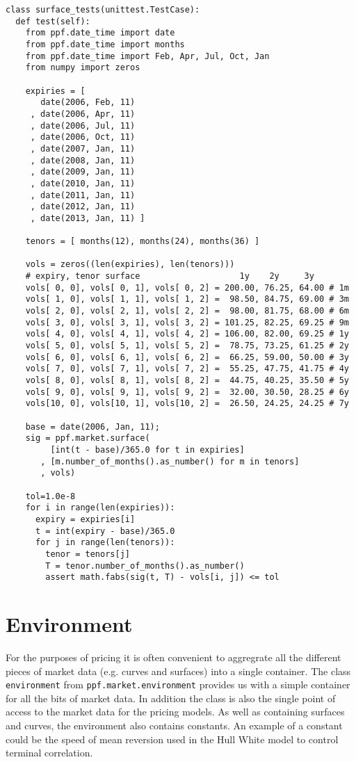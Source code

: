 \begin{verbatim}
class surface_tests(unittest.TestCase):
  def test(self):
    from ppf.date_time import date
    from ppf.date_time import months
    from ppf.date_time import Feb, Apr, Jul, Oct, Jan
    from numpy import zeros

    expiries = [
       date(2006, Feb, 11)
     , date(2006, Apr, 11)
     , date(2006, Jul, 11)
     , date(2006, Oct, 11)
     , date(2007, Jan, 11)
     , date(2008, Jan, 11)
     , date(2009, Jan, 11)
     , date(2010, Jan, 11)
     , date(2011, Jan, 11)
     , date(2012, Jan, 11)
     , date(2013, Jan, 11) ]

    tenors = [ months(12), months(24), months(36) ]

    vols = zeros((len(expiries), len(tenors)))
    # expiry, tenor surface                    1y    2y     3y                                
    vols[ 0, 0], vols[ 0, 1], vols[ 0, 2] = 200.00, 76.25, 64.00 # 1m
    vols[ 1, 0], vols[ 1, 1], vols[ 1, 2] =  98.50, 84.75, 69.00 # 3m
    vols[ 2, 0], vols[ 2, 1], vols[ 2, 2] =  98.00, 81.75, 68.00 # 6m
    vols[ 3, 0], vols[ 3, 1], vols[ 3, 2] = 101.25, 82.25, 69.25 # 9m
    vols[ 4, 0], vols[ 4, 1], vols[ 4, 2] = 106.00, 82.00, 69.25 # 1y
    vols[ 5, 0], vols[ 5, 1], vols[ 5, 2] =  78.75, 73.25, 61.25 # 2y
    vols[ 6, 0], vols[ 6, 1], vols[ 6, 2] =  66.25, 59.00, 50.00 # 3y
    vols[ 7, 0], vols[ 7, 1], vols[ 7, 2] =  55.25, 47.75, 41.75 # 4y
    vols[ 8, 0], vols[ 8, 1], vols[ 8, 2] =  44.75, 40.25, 35.50 # 5y
    vols[ 9, 0], vols[ 9, 1], vols[ 9, 2] =  32.00, 30.50, 28.25 # 6y
    vols[10, 0], vols[10, 1], vols[10, 2] =  26.50, 24.25, 24.25 # 7y

    base = date(2006, Jan, 11);
    sig = ppf.market.surface(
         [int(t - base)/365.0 for t in expiries]
       , [m.number_of_months().as_number() for m in tenors]
       , vols)

    tol=1.0e-8
    for i in range(len(expiries)):
      expiry = expiries[i]
      t = int(expiry - base)/365.0
      for j in range(len(tenors)):
        tenor = tenors[j]
        T = tenor.number_of_months().as_number()
        assert math.fabs(sig(t, T) - vols[i, j]) <= tol 
\end{verbatim}

\section{Environment} \label{sec:market}

For the purposes of pricing it is often convenient to aggregrate all
the different pieces of market data (e.g. curves and surfaces) into a
single container. The class \verb|environment| from
\verb|ppf.market.environment| provides us with a simple container for
all the bits of market data. In addition the class is also the single
point of access to the market data for the pricing models. As well as
containing surfaces and curves, the environment also contains
constants. An example of a constant could be the speed of mean
reversion used in the Hull White model to control terminal
correlation.

